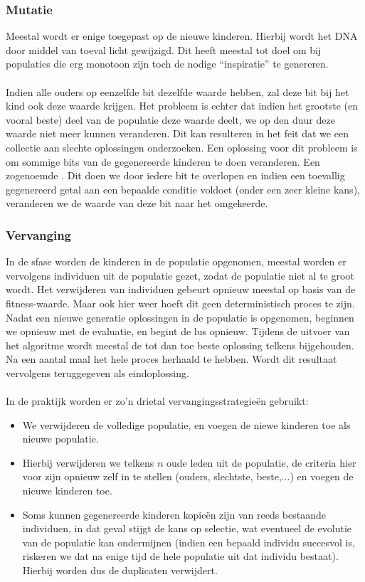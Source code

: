\subsubsection{Mutatie}Meestal wordt er enige  toegepast op de nieuwe kinderen. Hierbij wordt het DNA door middel van toeval licht gewijzigd. Dit heeft meestal tot doel om bij populaties die erg monotoon zijn toch de nodige ``inspiratie'' te genereren.
\paragraph{}Indien alle ouders op eenzelfde bit dezelfde waarde hebben, zal deze bit bij het kind ook deze waarde krijgen. Het probleem is echter dat indien het grootste (en vooral beste) deel van de populatie deze waarde deelt, we op den duur deze waarde niet meer kunnen veranderen. Dit kan resulteren in het feit dat we een collectie aan slechte oplossingen onderzoeken. Een oplossing voor dit probleem is om sommige bits van de gegenereerde kinderen te doen veranderen. Een zogenoemde . Dit doen we door iedere bit te overlopen en indien een toevallig gegenereerd getal aan een bepaalde conditie voldoet (onder een zeer kleine kans), veranderen we de waarde van deze bit naar het omgekeerde.
\subsubsection{Vervanging}In de sfase worden de kinderen in de populatie opgenomen, meestal worden er vervolgens individuen uit de populatie gezet, zodat de populatie niet al te groot wordt. Het verwijderen van individuen gebeurt opnieuw meestal op basis van de fitness-waarde. Maar ook hier weer hoeft dit geen deterministisch proces te zijn. Nadat een nieuwe generatie oplossingen in de populatie is opgenomen, beginnen we opnieuw met de evaluatie, en begint de lus opnieuw. Tijdens de uitvoer van het algoritme wordt meestal de tot dan toe beste oplossing telkens bijgehouden. Na een aantal maal het hele proces herhaald te hebben. Wordt dit resultaat vervolgens teruggegeven als eindoplossing.
\paragraph{}In de praktijk worden er zo'n drietal vervangingsstrategieën gebruikt:
\begin{itemize}
 \item {} We verwijderen de volledige populatie, en voegen de niewe kinderen toe als nieuwe populatie.
 \item {} Hierbij verwijderen we telkens $n$ oude leden uit de populatie, de criteria hier voor zijn opnieuw zelf in te stellen (ouders, slechtste, beste,...) en voegen de nieuwe kinderen toe.
 \item {} Soms kunnen gegenereerde kinderen kopieën zijn van reeds bestaande individuen, in dat geval stijgt de kans op selectie, wat eventueel de evolutie van de populatie kan ondermijnen (indien een bepaald individu succesvol is, riskeren we dat na enige tijd de hele populatie uit dat individu bestaat). Hierbij worden dus de duplicaten verwijdert.
\end{itemize}
